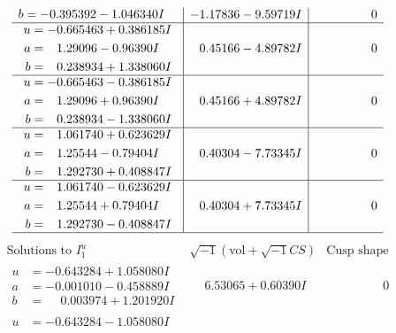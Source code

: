 \documentclass[1p]{elsarticle_modified}
\theoremstyle{definition}
\newcommand{\I}{\sqrt{-1}}
\begin{document}
$$\begin{array}{c|c|c}
\begin{aligned}
b &= -0.395392 - 1.046340 I\end{aligned}
 & -1.17836 - 9.59719 I & \phantom{-0.000000 } 0 \\ \hline\begin{aligned}
u &= -0.665463 + 0.386185 I \\
a &= \phantom{-}1.29096 - 0.96390 I \\
b &= \phantom{-}0.238934 + 1.338060 I\end{aligned}
 & \phantom{-}0.45166 - 4.89782 I & \phantom{-0.000000 } 0 \\ \hline\begin{aligned}
u &= -0.665463 - 0.386185 I \\
a &= \phantom{-}1.29096 + 0.96390 I \\
b &= \phantom{-}0.238934 - 1.338060 I\end{aligned}
 & \phantom{-}0.45166 + 4.89782 I & \phantom{-0.000000 } 0 \\ \hline\begin{aligned}
u &= \phantom{-}1.061740 + 0.623629 I \\
a &= \phantom{-}1.25544 - 0.79404 I \\
b &= \phantom{-}1.292730 + 0.408847 I\end{aligned}
 & \phantom{-}0.40304 - 7.73345 I & \phantom{-0.000000 } 0 \\ \hline\begin{aligned}
u &= \phantom{-}1.061740 - 0.623629 I \\
a &= \phantom{-}1.25544 + 0.79404 I \\
b &= \phantom{-}1.292730 - 0.408847 I\end{aligned}
 & \phantom{-}0.40304 + 7.73345 I & \phantom{-0.000000 } 0\\
 \hline 
 \end{array}$$\newpage$$\begin{array}{c|c|c}  
\text{Solutions to }I^u_{1}& \I (\text{vol} + \sqrt{-1}CS) & \text{Cusp shape}\\
 \hline 
\begin{aligned}
u &= -0.643284 + 1.058080 I \\
a &= -0.001010 - 0.458889 I \\
b &= \phantom{-}0.003974 + 1.201920 I\end{aligned}
 & \phantom{-}6.53065 + 0.60390 I & \phantom{-0.000000 } 0 \\ \hline\begin{aligned}
u &= -0.643284 - 1.058080 I \\

\end{aligned}
\end{array}$$
\end{document}
